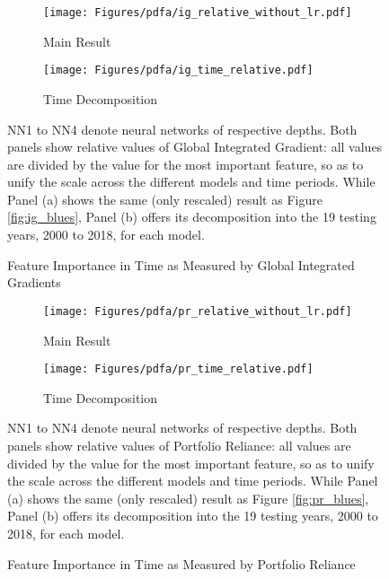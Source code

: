 		\begin{figure}[!htb]	
			\centering		
			\begin{subfigure}[t]{\textwidth}
				\texttt{[image: Figures/pdfa/ig\_relative\_without\_lr.pdf]}
				\caption{Main Result}
				\label{fig:ig_time_main}
			\end{subfigure}
			
			\begin{subfigure}[t]{\textwidth}
				\centering
				\texttt{[image: Figures/pdfa/ig\_time\_relative.pdf]}
				\caption{Time Decomposition}
				\label{fig:ig_time_relative}
			\end{subfigure}
			\caption{Feature Importance in Time as Measured by Global Integrated Gradients}
			\label{fig:ig_time}
			\medskip
			\small
			NN1 to NN4 denote neural networks of respective depths. Both panels show relative values of Global Integrated Gradient: all values are divided by the value for the most important feature, so as to unify the scale across the different models and time periods. While Panel (a) shows the same (only rescaled) result as Figure \ref{fig:ig_blues}, Panel (b) offers its decomposition into the 19 testing years, 2000 to 2018, for each model. 
		\end{figure}
	
		\begin{figure}[!htb]	
			\centering		
			\begin{subfigure}[t]{\textwidth}
				\texttt{[image: Figures/pdfa/pr\_relative\_without\_lr.pdf]}
				\caption{Main Result}
				\label{fig:pr_time_main}
			\end{subfigure}
			
			\begin{subfigure}[t]{\textwidth}
				\centering
				\texttt{[image: Figures/pdfa/pr\_time\_relative.pdf]}
				\caption{Time Decomposition}
				\label{fig:pr_time_relative}
			\end{subfigure}
			\caption{Feature Importance in Time as Measured by Portfolio Reliance}
			\label{fig:pr_time}
			\medskip
			\small
			NN1 to NN4 denote neural networks of respective depths. Both panels show relative values of Portfolio Reliance: all values are divided by the value for the most important feature, so as to unify the scale across the different models and time periods.  While Panel (a) shows the same (only rescaled) result as Figure \ref{fig:pr_blues}, Panel (b) offers its decomposition into the 19 testing years, 2000 to 2018, for each model. 
		\end{figure}
	
